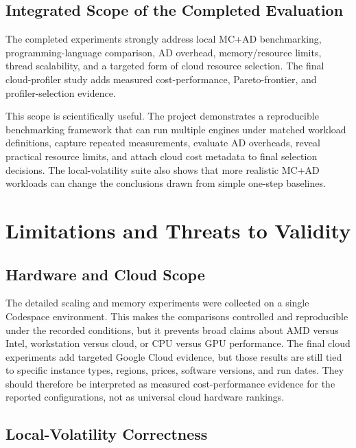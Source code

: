 \subsection{Integrated Scope of the Completed Evaluation}
\label{subsec:discussion-scope}

The completed experiments strongly address local MC+AD benchmarking,
programming-language comparison, AD overhead, memory/resource limits, thread
scalability, and a targeted form of cloud resource selection. The final
cloud-profiler study adds measured cost-performance, Pareto-frontier, and
profiler-selection evidence.

This scope is scientifically useful. The project demonstrates a reproducible
benchmarking framework that can run multiple engines under matched workload
definitions, capture repeated measurements, evaluate AD overheads, reveal
practical resource limits, and attach cloud cost metadata to final selection
decisions. The local-volatility suite also shows that more realistic MC+AD
workloads can change the conclusions drawn from simple one-step baselines.

\section{Limitations and Threats to Validity}
\label{sec:results-limitations}

\subsection{Hardware and Cloud Scope}
\label{subsec:limitations-single-machine}

The detailed scaling and memory experiments were collected on a single
Codespace environment. This makes the comparisons controlled and reproducible
under the recorded conditions, but it prevents broad claims about AMD versus
Intel, workstation versus cloud, or CPU versus GPU performance. The final cloud
experiments add targeted Google Cloud evidence, but those results are still
tied to specific instance types, regions, prices, software versions, and run
dates. They should therefore be interpreted as measured cost-performance
evidence for the reported configurations, not as universal cloud hardware
rankings.

\subsection{Local-Volatility Correctness}
\label{subsec:limitations-localvol-correctness}

